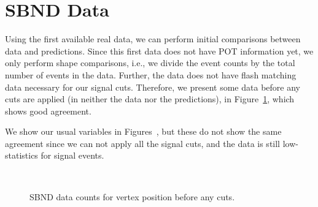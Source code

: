 \documentclass{article}
\begin{document}
\clearpage
\section{SBND Data}

Using the first available real data, we can perform initial comparisons between data and predictions. 
Since this first data does not have POT information yet, we only perform shape comparisons, i.e., we divide 
the event counts by the total number of events in the data. Further, the data does not have flash matching data 
necessary for our signal cuts. Therefore, we present some data before any cuts are applied (in neither the data 
nor the predictions), in Figure~\ref{fig:sbnd-no-cut-vertex}, which shows good agreement. 

We show our usual variables in Figures~,
but these do not show the same agreement since we can not apply all the signal cuts, and the data is still 
low-statistics for signal events. 

\begin{figure}[H]
    \centering
     \\
    \caption{SBND data counts for vertex position before any cuts.}
    \label{fig:sbnd-no-cut-vertex}
\end{figure}
\end{document}
